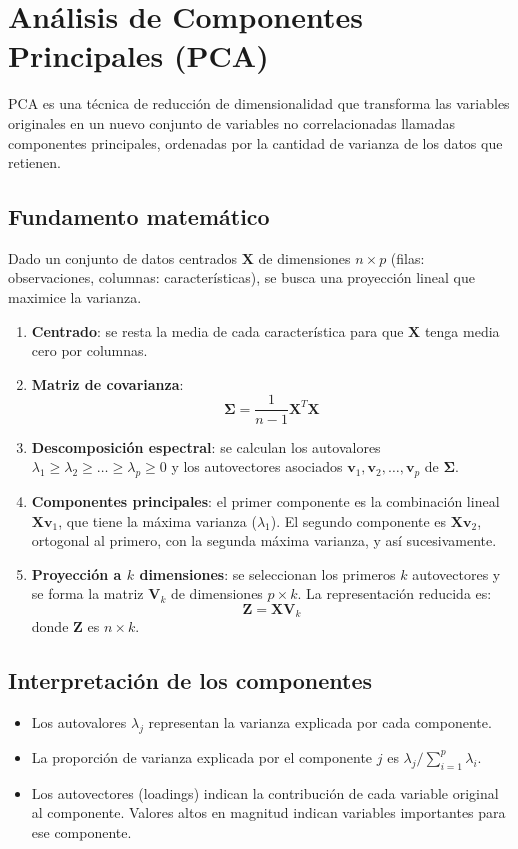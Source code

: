 \documentclass[12pt,a4paper,openany,oneside]{book}
\begin{document}
\section{Análisis de Componentes Principales (PCA)}

PCA es una técnica de reducción de dimensionalidad que transforma las variables originales en un nuevo conjunto de variables no correlacionadas llamadas componentes principales, ordenadas por la cantidad de varianza de los datos que retienen.

\subsection{Fundamento matemático}

Dado un conjunto de datos centrados \(\mathbf{X}\) de dimensiones \(n \times p\) (filas: observaciones, columnas: características), se busca una proyección lineal que maximice la varianza.

\begin{enumerate}
    \item \textbf{Centrado}: se resta la media de cada característica para que \(\mathbf{X}\) tenga media cero por columnas.
    \item \textbf{Matriz de covarianza}:
    \[
    \mathbf{\Sigma} = \frac{1}{n-1} \mathbf{X}^T \mathbf{X}
    \]
    \item \textbf{Descomposición espectral}: se calculan los autovalores \(\lambda_1 \ge \lambda_2 \ge \dots \ge \lambda_p \ge 0\) y los autovectores asociados \(\mathbf{v}_1, \mathbf{v}_2, \dots, \mathbf{v}_p\) de \(\mathbf{\Sigma}\).
    \item \textbf{Componentes principales}: el primer componente es la combinación lineal \(\mathbf{X} \mathbf{v}_1\), que tiene la máxima varianza (\(\lambda_1\)). El segundo componente es \(\mathbf{X} \mathbf{v}_2\), ortogonal al primero, con la segunda máxima varianza, y así sucesivamente.
    \item \textbf{Proyección a \(k\) dimensiones}: se seleccionan los primeros \(k\) autovectores y se forma la matriz \(\mathbf{V}_k\) de dimensiones \(p \times k\). La representación reducida es:
    \[
    \mathbf{Z} = \mathbf{X} \mathbf{V}_k
    \]
    donde \(\mathbf{Z}\) es \(n \times k\).
\end{enumerate}

\subsection{Interpretación de los componentes}
\begin{itemize}
    \item Los autovalores \(\lambda_j\) representan la varianza explicada por cada componente.
    \item La proporción de varianza explicada por el componente \(j\) es \(\lambda_j / \sum_{i=1}^p \lambda_i\).
    \item Los autovectores (loadings) indican la contribución de cada variable original al componente. Valores altos en magnitud indican variables importantes para ese componente.
\end{itemize}
\end{document}
